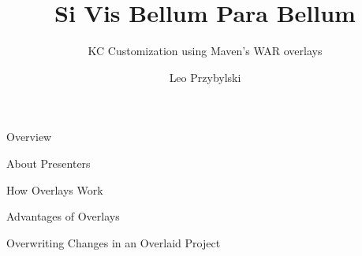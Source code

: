 \documentclass[xcolor=dvipsnames,14pt]{beamer}
\begin{document}
\title{Si Vis Bellum Para Bellum}
\subtitle{KC Customization using Maven's WAR overlays}
\author[Leo]{Leo Przybylski}


\begin{frame}[plain]
  \titlepage
\end{frame}

\begin{frame}{Overview}
\end{frame}

\begin{frame}{About Presenters}
\end{frame}

\begin{frame}{How Overlays Work}
\end{frame}

\begin{frame}{Advantages of Overlays}
\end{frame}

\begin{frame}{Overwriting Changes in an Overlaid Project}
\end{frame}
\end{document}
